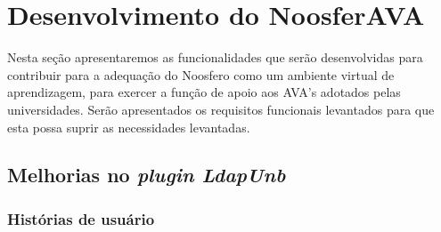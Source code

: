 \section{Desenvolvimento do NoosferAVA}
\label{desen-noosferAVA}

Nesta seção apresentaremos as funcionalidades que serão desenvolvidas para contribuir para a adequação do Noosfero como um ambiente virtual de aprendizagem, para exercer a função de apoio aos AVA's adotados pelas universidades. Serão apresentados os requisitos funcionais levantados para que esta possa suprir as necessidades levantadas. 

\subsection{Melhorias no \textit{plugin LdapUnb}}

\subsubsection*{Histórias de usuário}

